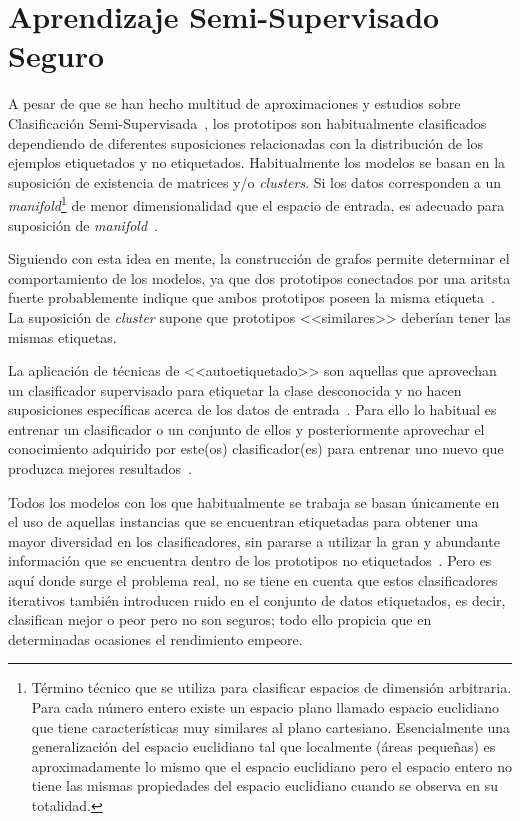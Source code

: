 \section{Aprendizaje Semi-Supervisado Seguro}
A pesar de que se han hecho multitud de aproximaciones y estudios sobre Clasificación Semi-Supervisada~\cite{jesper2020survey}, los prototipos son habitualmente clasificados dependiendo de diferentes suposiciones relacionadas con la distribución de los ejemplos etiquetados y no etiquetados. Habitualmente los modelos se basan en la suposición de existencia de matrices y/o \textit{clusters}. Si los datos corresponden a un \textit{manifold}\footnote{Término técnico que se utiliza para clasificar espacios de dimensión arbitraria. Para cada número entero existe un espacio plano llamado espacio euclidiano que tiene características muy similares al plano cartesiano. Esencialmente una generalización del espacio euclidiano tal que localmente (áreas pequeñas) es aproximadamente lo mismo que el espacio euclidiano pero el espacio entero no tiene las mismas propiedades del espacio euclidiano cuando se observa en su totalidad.} de menor dimensionalidad que el espacio de entrada, es adecuado para suposición de \textit{manifold}~\cite{wang2011solution}.

Siguiendo con esta idea en mente, la construcción de grafos permite determinar el comportamiento de los modelos, ya que dos prototipos conectados por una aritsta fuerte probablemente indique que ambos prototipos poseen la misma etiqueta~\cite{wang2013semi}. La suposición de \textit{cluster} supone que prototipos <<similares>> deberían tener las mismas etiquetas.

La aplicación de técnicas de <<autoetiquetado>> son aquellas que aprovechan un clasificador supervisado para etiquetar la clase desconocida y no hacen suposiciones específicas acerca de los datos de entrada~\cite{triguero2015self}. Para ello lo habitual es entrenar un clasificador o un conjunto de ellos y posteriormente aprovechar el conocimiento adquirido por este(os) clasificador(es) para entrenar uno nuevo que produzca mejores resultados~\cite{blum1998combining, zhou2005tri}.

Todos los modelos con los que habitualmente se trabaja se basan únicamente en el uso de aquellas instancias que se encuentran etiquetadas para obtener una mayor diversidad en los clasificadores, sin pararse a utilizar la gran y abundante información que se encuentra dentro de los prototipos no etiquetados~\cite{zhao2021safe}. Pero es aquí donde surge el problema real, no se tiene en cuenta que estos clasificadores iterativos también introducen ruido en el conjunto de datos etiquetados, es decir, clasifican mejor o peor pero no son seguros; todo ello propicia que en determinadas ocasiones el rendimiento empeore.

